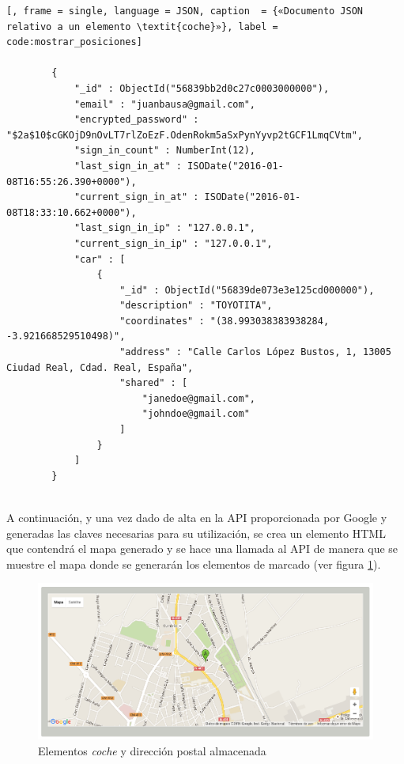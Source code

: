 	\begin{lstlisting}[, frame = single, language = JSON, caption  = {«Documento JSON relativo a un elemento \textit{coche}»}, label = code:mostrar_posiciones]
		
		{ 
		    "_id" : ObjectId("56839bb2d0c27c0003000000"), 
		    "email" : "juanbausa@gmail.com", 
		    "encrypted_password" : "$2a$10$cGKOjD9nOvLT7rlZoEzF.OdenRokm5aSxPynYyvp2tGCF1LmqCVtm", 
		    "sign_in_count" : NumberInt(12), 
		    "last_sign_in_at" : ISODate("2016-01-08T16:55:26.390+0000"), 
		    "current_sign_in_at" : ISODate("2016-01-08T18:33:10.662+0000"), 
		    "last_sign_in_ip" : "127.0.0.1", 
		    "current_sign_in_ip" : "127.0.0.1", 
		    "car" : [
		        {
		            "_id" : ObjectId("56839de073e3e125cd000000"), 
		            "description" : "TOYOTITA", 
		            "coordinates" : "(38.993038383938284, -3.921668529510498)", 
		            "address" : "Calle Carlos López Bustos, 1, 13005 Ciudad Real, Cdad. Real, España", 
		            "shared" : [
		                "janedoe@gmail.com", 
		                "johndoe@gmail.com"
		            ]
		        }
		    ]
		}
		
	\end{lstlisting}
	
	A continuación, y una vez dado de alta en la API proporcionada por Google y generadas las claves necesarias para su utilización, se crea un elemento HTML que contendrá el mapa generado y se hace una llamada al API de manera que se muestre el mapa donde se generarán los elementos de marcado (ver figura \ref{fig:mostrar_posiciones2}).\\

	\begin{figure}[H]
		\centering
		\includegraphics[width=15cm, fbox={\fboxrule} 4mm]{images/05-resultados/14-mostrar_posiciones_2.png}
		\caption{Elementos \textit{coche} y dirección postal almacenada}
		\label{fig:mostrar_posiciones2}
	\end{figure}
	

